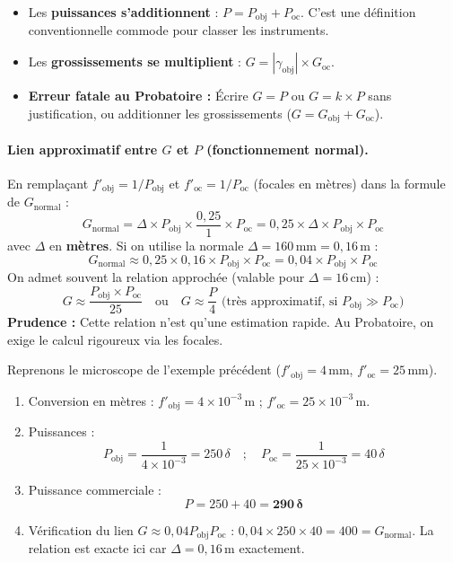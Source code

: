 \documentclass[11pt]{article}
\begin{document}
\begin{attention}
\begin{itemize}
    \item Les \textbf{puissances s'additionnent} : $P = P_{\text{obj}} + P_{\text{oc}}$. C'est une définition conventionnelle commode pour classer les instruments.
    \item Les \textbf{grossissements se multiplient} : $G = |\gamma_{\text{obj}}| \times G_{\text{oc}}$.
    \item \textbf{Erreur fatale au Probatoire :} Écrire $G = P$ ou $G = k \times P$ sans justification, ou additionner les grossissements ($G = G_{\text{obj}} + G_{\text{oc}}$).
\end{itemize}
\end{attention}

\paragraph{Lien approximatif entre $G$ et $P$ (fonctionnement normal).}
En remplaçant $f'_{\text{obj}} = 1/P_{\text{obj}}$ et $f'_{\text{oc}} = 1/P_{\text{oc}}$ (focales en mètres) dans la formule de $G_{\text{normal}}$ :
\[
G_{\text{normal}} = \Delta \times P_{\text{obj}} \times \frac{0,25}{1} \times P_{\text{oc}} = 0,25 \times \Delta \times P_{\text{obj}} \times P_{\text{oc}}
\]
avec $\Delta$ en \textbf{mètres}.
Si on utilise la normale $\Delta = 160\,\text{mm} = 0,16\,\text{m}$ :
\[
G_{\text{normal}} \approx 0,25 \times 0,16 \times P_{\text{obj}} \times P_{\text{oc}} = 0,04 \times P_{\text{obj}} \times P_{\text{oc}}
\]
On admet souvent la relation approchée (valable pour $\Delta = 16\,\text{cm}$) :
\[
\boxed{G \approx \frac{P_{\text{obj}} \times P_{\text{oc}}}{25} \quad \text{ou} \quad G \approx \frac{P}{4} \text{ (très approximatif, si } P_{\text{obj}} \gg P_{\text{oc}})}
\]
\textbf{Prudence :} Cette relation n'est qu'une estimation rapide. Au Probatoire, on exige le calcul rigoureux via les focales.

\begin{exemplebox}
Reprenons le microscope de l'exemple précédent ($f'_{\text{obj}} = 4\,\text{mm}$, $f'_{\text{oc}} = 25\,\text{mm}$).
\begin{enumerate}
    \item Conversion en mètres : $f'_{\text{obj}} = 4 \times 10^{-3}\,\text{m}$ ; $f'_{\text{oc}} = 25 \times 10^{-3}\,\text{m}$.
    \item Puissances :
    \[
    P_{\text{obj}} = \frac{1}{4 \times 10^{-3}} = 250\,\delta \quad ; \quad P_{\text{oc}} = \frac{1}{25 \times 10^{-3}} = 40\,\delta
    \]
    \item Puissance commerciale :
    \[
    P = 250 + 40 = \mathbf{290\,\delta}
    \]
    \item Vérification du lien $G \approx 0,04 P_{\text{obj}} P_{\text{oc}}$ :
    $0,04 \times 250 \times 40 = 400 = G_{\text{normal}}$. La relation est exacte ici car $\Delta = 0,16\,\text{m}$ exactement.
\end{enumerate}
\end{exemplebox}
\end{document}
